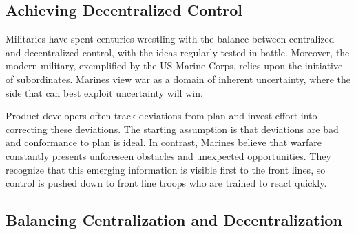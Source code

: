 \documentclass{article}
\begin{document}
\begin{center}
     \section{Achieving Decentralized Control}
\end{center}

\begin{multicols}{2}

\noindent
Militaries have spent centuries wrestling with the balance between centralized and decentralized control, with the ideas regularly tested in battle. Moreover, the modern military, exemplified by the US Marine Corps, relies upon the initiative of subordinates. Marines view war as a domain of inherent uncertainty, where the side that can best exploit uncertainty will win.

Product developers often track deviations from plan and invest effort into correcting these deviations. The starting assumption is that deviations are bad and conformance to plan is ideal. In contrast, Marines believe that warfare constantly presents unforeseen obstacles and unexpected opportunities. They recognize that this emerging information is visible first to the front lines, so control is pushed down to front line troops who are trained to react quickly.

\end{multicols}

\begin{center}
\section{Balancing Centralization and Decentralization}
\end{center}
\end{document}
